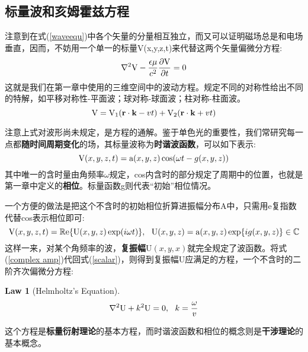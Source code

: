 \documentclass[12pt]{ctexart}%
\newtheorem{theorem}{Law}
\begin{document}
\subsection*{标量波和亥姆霍兹方程}
注意到在式(\ref{waveequ})中各个矢量的分量相互独立，而又可以证明磁场总是和电场垂直，因而，不妨用一个单一的标量\textup{V(x,y,z,t)}来代替这两个矢量偏微分方程:
\begin{equation}
    \nabla^2\textup{V}-\frac{\epsilon\mu}{c^2}\frac{\partial{\textup{V}}}{\partial t} = 0
    \label{scalar}
\end{equation}
这就是我们在第一章中使用的三维空间中的波动方程。规定不同的对称性给出不同的特解，如平移对称性-平面波；球对称-球面波；柱对称-柱面波。
\begin{equation}
    \textup{V} = \textup{V}_1(\textbf{r}\cdot\textbf{k}-vt)+\textup{V}_2(\textbf{r}\cdot\textbf{k}+vt)
\end{equation}
\par 注意上式对波形尚未规定，是方程的通解。鉴于单色光的重要性，我们常研究每一点都\textbf{随时间周期变化}的场，其标量波称为\textbf{时谐波函数}，可以如下表示:
\begin{equation}
    \textup{V}(x,y,z,t)=\textup{a}(x,y,z)\cos (\omega t-g(x,y,z))
\end{equation}
其中唯一的含时量由角频率$\omega$规定，cos内含时的部分规定了周期中的位置，也就是第一章中定义的\textbf{相位}。标量函数g则代表“初始”相位情况。
\par 一个方便的做法是把这个不含时的初始相位折算进振幅分布\textup{A}中，只需用e复指数代替cos表示相位即可:
\begin{equation}
    \textup{V}(x,y,z,t)=\mathbb{R}\textup{e}\{\textup{U}(x,y,z)\exp (i \omega t)\}, \ \ \textup{U}(x,y,z) = \textup{a}(x,y,z)\exp\{ig(x,y,z)\} \in \mathbb{C}
    \label{complex amp}
\end{equation}
这样一来，对某个角频率的波，\textbf{复振幅}\textup{U}$(x,y,x)$就完全规定了波函数。将式(\ref{complex amp})代回式(\ref{scalar})，则得到复振幅\textup{U}应满足的方程，一个不含时的二阶齐次偏微分方程:
\begin{theorem}[Helmholtz's Equation]\label{Helmholtz}
    \[\nabla^2 \textup{U} + k^2 \textup{U}=0, \ \ k = \frac{\omega}{v}\]
\end{theorem}
这个方程是\textbf{标量衍射理论}的基本方程，而时谐波函数和相位的概念则是\textbf{干涉理论}的基本概念。
\end{document}
